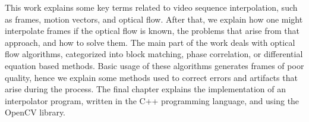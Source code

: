 This work explains some key terms related to video sequence interpolation, such as frames, motion vectors, and optical flow. After that, we explain how one might
interpolate frames if the optical flow is known, the problems that arise from that approach, and how to solve them. The main part of the work deals with optical flow
algorithms, categorized into block matching, phase correlation, or differential equation based methods. Basic usage of these algorithms generates frames
of poor quality, hence we explain some methods used to correct errors and artifacts that arise during the process. The final chapter explains the implementation
of an interpolator program, written in the C++ programming language, and using the OpenCV library.